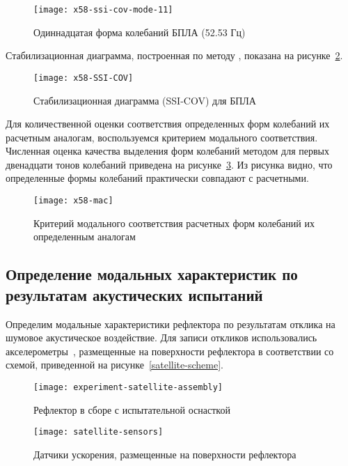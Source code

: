 \begin{figure}[H]
	\centerfloat
	\texttt{[image: x58-ssi-cov-mode-11]}
	\caption{Одиннадцатая форма колебаний БПЛА (52.53 Гц)} \label{x58-ssi-cov-mode-11}
\end{figure}

Стабилизационная диаграмма, построенная по методу , показана на рисунке~\ref{x58-SSI-COV}.

\begin{figure}[H]
	\centerfloat
	\texttt{[image: x58-SSI-COV]}
	\caption{Стабилизационная диаграмма (SSI-COV) для БПЛА} \label{x58-SSI-COV}
\end{figure}

Для количественной оценки соответствия определенных форм колебаний их расчетным аналогам, воспользуемся критерием модального соответствия. Численная оценка качества выделения форм колебаний методом  для первых двенадцати тонов колебаний приведена на рисунке~\ref{x58-mac}. Из рисунка видно, что определенные формы колебаний практически совпадают с расчетными.

\begin{figure}[!htb]
	\centerfloat
	\texttt{[image: x58-mac]}
	\caption{Критерий модального соответствия расчетных форм колебаний их определенным аналогам} \label{x58-mac}
\end{figure}

\subsection{Определение модальных характеристик по результатам акустических испытаний}

Определим модальные характеристики рефлектора  по результатам отклика на шумовое акустическое воздействие. Для записи откликов использовались акселерометры~, размещенные на поверхности рефлектора в соответствии со схемой, приведенной на рисунке~\ref{satellite-scheme}.

\begin{figure}[!htb]
	\centerfloat
	\texttt{[image: experiment-satellite-assembly]}
	\caption{Рефлектор в сборе с испытательной оснасткой} \label{experiment-satellite-assembly}
\end{figure}

\begin{figure}[!htb]
	\centerfloat
	\texttt{[image: satellite-sensors]}
	\caption{Датчики ускорения, размещенные на поверхности рефлектора} \label{satellite-sensors}
\end{figure}

